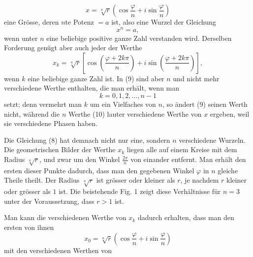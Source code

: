 
\begin{equation}
 x=\sqrt[n]{r}\left(\cos\frac{\varphi}{n}+i\sin\frac{\varphi}{n}\right)
\tag{7}
\end{equation}
eine Grösse, deren $n$te Potenz $=a$ ist, also eine Wurzel der Gleichung
\begin{equation}
 x^n=a,
\tag{8}
\end{equation}
wenn unter $n$ eine beliebige positive ganze Zahl verstanden wird. Derselben Forderung genügt aber auch jeder der Werthe
\begin{equation}
 x_k=\sqrt[n]{r}\left[\cos\left(\frac{\varphi+2k\pi}{n}\right)+i\sin\left(\frac{\varphi+2k\pi}{n}\right)\right],
\tag{9}
\end{equation}
wenn $k$ eine beliebige ganze Zahl ist. In (9) sind aber $n$ und nicht mehr verschiedene Werthe enthalten, die man erhält, wenn man
\begin{equation}
 k=0,1,2,\ldots,n-1
\tag{10}
\end{equation}
setzt; denn vermehrt man $k$ um ein Vielfaches von $n$, so ändert (9) seinen Werth nicht, während die $n$ Werthe (10) lauter verschiedene Werthe von $x$ ergeben, weil sie verschiedene Phasen haben.

Die Gleichung (8) hat demnach nicht nur eine, sondern $n$ verschiedene Wurzeln. Die geometrischen Bilder der Werthe $x_k$ liegen alle auf einem Kreise mit dem Radius $\sqrt[n]{r}$, und zwar um den Winkel $\frac{2\pi}{n}$ von einander entfernt. Man erhält den ersten dieser Punkte dadurch, dass man den gegebenen Winkel $\varphi$ in $n$ gleiche Theile theilt. Der Radius $\sqrt[n]{r}$ ist grösser oder kleiner als $r$, je nachdem $r$ kleiner oder grösser als $1$ ist. Die beistehende Fig. 1 zeigt diese Verhältnisse für $n=3$ unter der Voraussetzung, dass $r>1$ ist.




Man kann die verschiedenen Werthe von $x_k$ dadurch erhalten, dass man den ersten von ihnen
\[
 x_0=\sqrt[n]{r}\left(\cos\frac{\varphi}{n}+i\sin\frac{\varphi}{n}\right)
\]
mit den verschiedenen Werthen von
